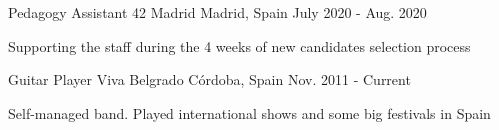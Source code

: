 

\begin{cventries}

  \cventry
    {Pedagogy Assistant} %
    {42 Madrid} %
    {Madrid, Spain} %
    {July 2020 - Aug. 2020} %
    {
      \begin{cvitems} %
        \item {Supporting the staff during the 4 weeks of new candidates selection process}
      \end{cvitems}
    }

  \cventry
    {Guitar Player} %
    {Viva Belgrado} %
    {Córdoba, Spain} %
    {Nov. 2011 - Current} %
    {
      \begin{cvitems} %
        \item {Self-managed band. Played international shows and some big festivals in Spain}
      \end{cvitems}
    }

\end{cventries}

